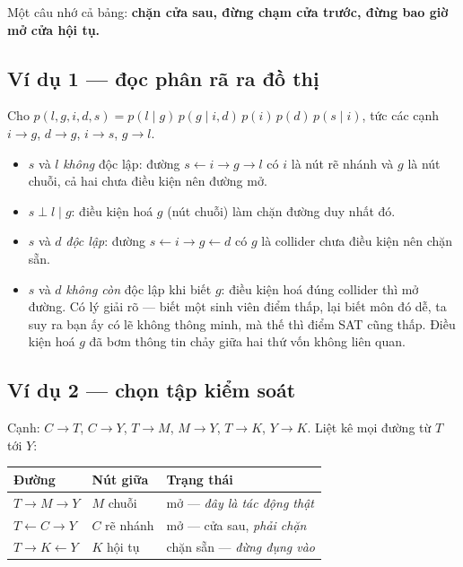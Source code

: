 \documentclass[11pt]{article}
\begin{document}
Một câu nhớ cả bảng: \textbf{chặn cửa sau, đừng chạm cửa trước, đừng bao giờ mở
cửa hội tụ.}

\subsection*{Ví dụ 1 --- đọc phân rã ra đồ thị}

Cho $p(l,g,i,d,s) = p(l\mid g)\,p(g\mid i,d)\,p(i)\,p(d)\,p(s\mid i)$, tức các
cạnh $i \to g$, $d \to g$, $i \to s$, $g \to l$.

\begin{itemize}
\item $s$ và $l$ \emph{không} độc lập: đường $s \leftarrow i \to g \to l$ có $i$ là
      nút rẽ nhánh và $g$ là nút chuỗi, cả hai chưa điều kiện nên đường mở.
\item $s \perp l \mid g$: điều kiện hoá $g$ (nút chuỗi) làm chặn đường duy nhất đó.
\item $s$ và $d$ \emph{độc lập}: đường $s \leftarrow i \to g \leftarrow d$ có $g$
      là collider chưa điều kiện nên chặn sẵn.
\item $s$ và $d$ \emph{không còn} độc lập khi biết $g$: điều kiện hoá đúng collider
      thì mở đường. Có lý giải rõ --- biết một sinh viên điểm thấp, lại biết môn
      đó dễ, ta suy ra bạn ấy có lẽ không thông minh, mà thế thì điểm SAT cũng
      thấp. Điều kiện hoá $g$ đã bơm thông tin chảy giữa hai thứ vốn không liên quan.
\end{itemize}

\subsection*{Ví dụ 2 --- chọn tập kiểm soát}

Cạnh: $C \to T$, $C \to Y$, $T \to M$, $M \to Y$, $T \to K$, $Y \to K$.
Liệt kê mọi đường từ $T$ tới $Y$:

\begin{center}
\begin{tabular}{@{}lll@{}}
\toprule
\textbf{Đường} & \textbf{Nút giữa} & \textbf{Trạng thái} \\
\midrule
$T \to M \to Y$ & $M$ chuỗi & mở --- \emph{đây là tác động thật} \\
$T \leftarrow C \to Y$ & $C$ rẽ nhánh & mở --- cửa sau, \emph{phải chặn} \\
$T \to K \leftarrow Y$ & $K$ hội tụ & chặn sẵn --- \emph{đừng đụng vào} \\
\bottomrule
\end{tabular}
\end{center}
\end{document}
